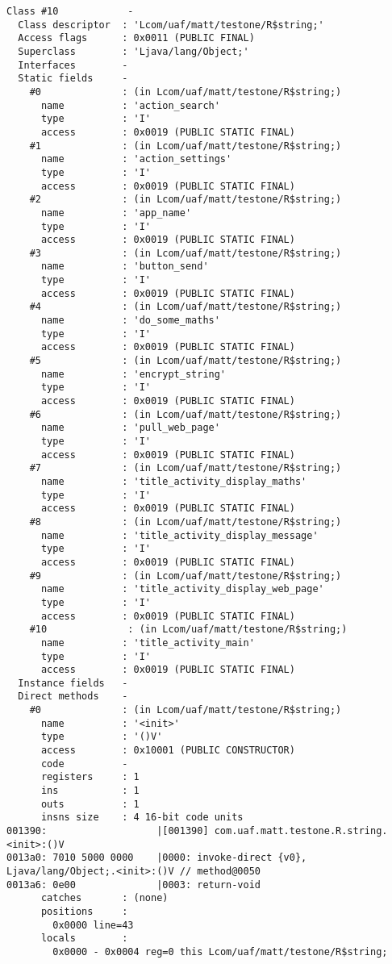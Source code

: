 \begin{lstlisting}
Class #10            -
  Class descriptor  : 'Lcom/uaf/matt/testone/R$string;'
  Access flags      : 0x0011 (PUBLIC FINAL)
  Superclass        : 'Ljava/lang/Object;'
  Interfaces        -
  Static fields     -
    #0              : (in Lcom/uaf/matt/testone/R$string;)
      name          : 'action_search'
      type          : 'I'
      access        : 0x0019 (PUBLIC STATIC FINAL)
    #1              : (in Lcom/uaf/matt/testone/R$string;)
      name          : 'action_settings'
      type          : 'I'
      access        : 0x0019 (PUBLIC STATIC FINAL)
    #2              : (in Lcom/uaf/matt/testone/R$string;)
      name          : 'app_name'
      type          : 'I'
      access        : 0x0019 (PUBLIC STATIC FINAL)
    #3              : (in Lcom/uaf/matt/testone/R$string;)
      name          : 'button_send'
      type          : 'I'
      access        : 0x0019 (PUBLIC STATIC FINAL)
    #4              : (in Lcom/uaf/matt/testone/R$string;)
      name          : 'do_some_maths'
      type          : 'I'
      access        : 0x0019 (PUBLIC STATIC FINAL)
    #5              : (in Lcom/uaf/matt/testone/R$string;)
      name          : 'encrypt_string'
      type          : 'I'
      access        : 0x0019 (PUBLIC STATIC FINAL)
    #6              : (in Lcom/uaf/matt/testone/R$string;)
      name          : 'pull_web_page'
      type          : 'I'
      access        : 0x0019 (PUBLIC STATIC FINAL)
    #7              : (in Lcom/uaf/matt/testone/R$string;)
      name          : 'title_activity_display_maths'
      type          : 'I'
      access        : 0x0019 (PUBLIC STATIC FINAL)
    #8              : (in Lcom/uaf/matt/testone/R$string;)
      name          : 'title_activity_display_message'
      type          : 'I'
      access        : 0x0019 (PUBLIC STATIC FINAL)
    #9              : (in Lcom/uaf/matt/testone/R$string;)
      name          : 'title_activity_display_web_page'
      type          : 'I'
      access        : 0x0019 (PUBLIC STATIC FINAL)
    #10              : (in Lcom/uaf/matt/testone/R$string;)
      name          : 'title_activity_main'
      type          : 'I'
      access        : 0x0019 (PUBLIC STATIC FINAL)
  Instance fields   -
  Direct methods    -
    #0              : (in Lcom/uaf/matt/testone/R$string;)
      name          : '<init>'
      type          : '()V'
      access        : 0x10001 (PUBLIC CONSTRUCTOR)
      code          -
      registers     : 1
      ins           : 1
      outs          : 1
      insns size    : 4 16-bit code units
001390:                   |[001390] com.uaf.matt.testone.R.string.<init>:()V
0013a0: 7010 5000 0000    |0000: invoke-direct {v0}, Ljava/lang/Object;.<init>:()V // method@0050
0013a6: 0e00              |0003: return-void
      catches       : (none)
      positions     :
        0x0000 line=43
      locals        :
        0x0000 - 0x0004 reg=0 this Lcom/uaf/matt/testone/R$string;


\end{lstlisting}
